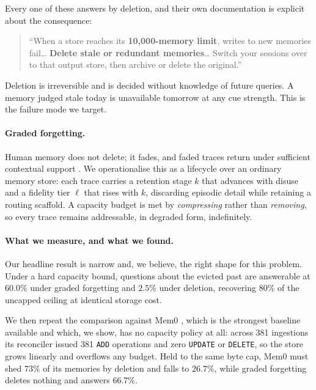 \documentclass{article}
\theoremstyle{definition}\newtheorem{remark}{Remark}
\theoremstyle{plain}\newtheorem{proposition}{Proposition}
\begin{document}
Every one of these answers by deletion, and their own documentation is explicit
about the consequence:

\begin{quote}\small
``When a store reaches its \textbf{10,000-memory limit}, writes to new memories
fail\ldots{} \textbf{Delete stale or redundant memories}\ldots{} Switch your
sessions over to that output store, then archive or delete the
original.'' \citep{anthropic2026memory}
\end{quote}

Deletion is irreversible and is decided without knowledge of future queries. A
memory judged stale today is unavailable tomorrow at any cue strength. This is
the failure mode we target.

\paragraph{Graded forgetting.} Human memory does not delete; it fades, and
faded traces return under sufficient contextual support
\citep{proust1913,aggleton1999,tulving1983}. We operationalise this as a
lifecycle over an ordinary memory store: each trace carries a retention stage
$k$ that advances with disuse and a fidelity tier $\ell$ that rises with $k$,
discarding episodic detail while retaining a routing scaffold. A capacity
budget is met by \emph{compressing} rather than \emph{removing}, so every trace
remains addressable, in degraded form, indefinitely.

\paragraph{What we measure, and what we found.} Our headline result is narrow
and, we believe, the right shape for this problem. Under a hard capacity bound,
questions about the evicted past are answerable at $60.0\%$ under graded
forgetting and $2.5\%$ under deletion, recovering $80\%$ of the uncapped
ceiling at identical storage cost.

We then repeat the comparison against Mem0 \citep{chhikara2025mem0}, which is
the strongest baseline available and which, we show, has no capacity policy at
all: across 381 ingestions its reconciler issued 381 \texttt{ADD} operations
and zero \texttt{UPDATE} or \texttt{DELETE}, so the store grows linearly and
overflows any budget. Held to the same byte cap, Mem0 must shed $73\%$ of its
memories by deletion and falls to $26.7\%$, while graded forgetting deletes
nothing and answers $66.7\%$.
\end{document}
